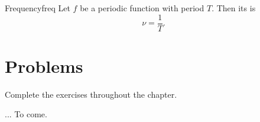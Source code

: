         \begin{df}{Frequency}{freq}
        Let $f$ be a periodic function with period $T$. Then its  is
        \[
        \nu = \frac{1}{T}.
        \]
        \end{df}
        
        \newpage
        
        \section{Problems}
        
        \begin{problem}
        Complete the exercises throughout the chapter.
        \end{problem}
        
        \begin{problem}
        ... To come.
        \end{problem}